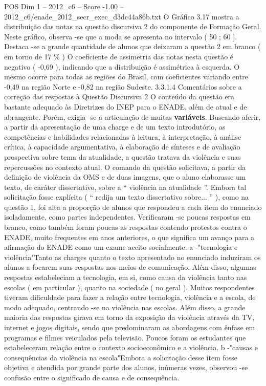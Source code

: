 \begin{textsample}{POS Dim 1 – 2012\_c6 – Score -1.00 – 2012\_c6/enade\_2012\_secr\_exec\_d3dc44a86b.txt}
O Gráfico 3.17 mostra a distribuição das notas na questão discursiva 2 do componente de Formação Geral.
Neste gráfico, observa -se que a moda se apresenta no intervalo ( 50 ; 60 ].
Destaca -se a grande quantidade de alunos que deixaram a questão 2 em branco ( em torno de 17 \% ) O coeficiente de assimetria das notas nesta questão é negativo ( -0,69 ), indicando que a distribuição é assimétrica à esquerda.
O mesmo ocorre para todas as regiões do Brasil, com coeficientes variando entre -0,49 na região Norte e -0,82 na região Sudeste. 3.3.1.4 Comentários sobre a correção das respostas à Questão Discursiva 2 O conteúdo da questão era bastante adequado às Diretrizes do INEP para o ENADE, além de atual e de abrangente.
Porém, exigia -se a articulação de muitas \textbf{variáveis}.
Buscando aferir, a partir da apresentação de uma charge e de um texto introdutório, as competências e habilidades relacionadas à leitura, à interpretação, à análise crítica, à capacidade argumentativa, à elaboração de sínteses e de avaliação prospectiva sobre tema da atualidade, a questão tratava da violência e suas repercussões no contexto atual.
O comando da questão solicitava, a partir da definição de violência da OMS e de duas imagens, que o aluno elaborasse um texto, de caráter dissertativo, sobre a “ violência na atualidade ”.
Embora tal solicitação fosse explícita ( “ redija um texto dissertativo sobre... ” ), como na questão 1, foi alta a proporção de alunos que respondeu a cada item do enunciado isoladamente, como partes independentes.
Verificaram -se poucas respostas em branco, como também foram poucas as respostas contendo protestos contra o ENADE, muito frequentes em anos anteriores, o que significa um avanço para a afirmação do ENADE como um exame aceito socialmente. a -"tecnologia e violência"Tanto as charges quanto o texto apresentado no enunciado induziram os alunos a focarem suas respostas nos meios de comunicação.
Além disso, algumas respostas estabeleciam a tecnologia, em si, como causa da violência tanto nas escolas ( em particular ), quanto na sociedade ( no geral ).
Muitos respondentes tiveram dificuldade para fazer a relação entre tecnologia, violência e a escola, de modo adequado, centrando -se na violência nas escolas.
Além disso, a grande maioria das respostas girava em torno da exposição da violência através da TV, internet e jogos digitais, sendo que predominaram as abordagens com ênfase em programas e filmes veiculados pela televisão.
Poucos foram os estudantes que estabeleceram relação entre o contexto socioeconômico e a violência. b -"causas e consequências da violência na escola"Embora a solicitação desse item fosse objetiva e atendida por grande parte dos alunos, inúmeras vezes, observou -se confusão entre o significado de causa e de consequência.

\end{textsample}
